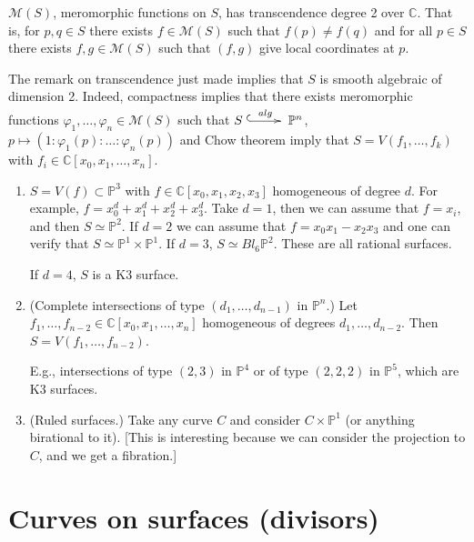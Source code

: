 $\mathcal{M}(S)$, meromorphic functions on
$S$, has transcendence degree
2 over $\mathbb{C}$.
That is, for $p,q \in S$
there exists $f \in \mathcal{M}(S)$
such that $f(p)\neq f(q)$
and for all $p \in S$ there exists $f,g \in
\mathcal{M}(S)$
such that $(f,g)$ give local coordinates at
$p$.

\begin{remark}
\label{remark-trans-impli-surfa-def}
The remark on transcendence just made implies
that $S$
is smooth algebraic of dimension 2.
Indeed, compactness implies that there exists
meromorphic functions  $\varphi_1,…,\varphi_n
\in \mathcal{M}(S)$
such that $S
\xymatrix{\ar@{^{(}->}[r]^{alg}&}\mathbb{P}
^n$,
$p \mapsto (1:\varphi_1(p):…:\varphi_n(p))$
and Chow theorem
imply that $S = V(f_1,…,f_k)$ with
$f_i \in \mathbb{C}[x_0,x_1,…,x_n]$.
\end{remark}

\begin{example}
\label{example-surfaces}
\begin{enumerate}
\item $S = V(f) \subset \mathbb{P}^3$
with $f \in \mathbb{C}[x_0,x_1,x_2,x_3]$
homogeneous of degree $d$.
For example, $f=x_0^d+x_1^d+x_2^d+x_3^d$.
Take $d=1$, then we can assume that $f=x_i$,
and then $S\simeq\mathbb{P}^2$.
If $d=2$ we can assume that
$f=x_0x_1-x_2x_3$ and
one can verify that $S \simeq \mathbb{P}^1
\times \mathbb{P}^1$.
If $d=3$, $S \simeq Bl_6\mathbb{P}^2$.
These are all rational surfaces.

If $d=4$, $S$ is a K3 surface.

\item (Complete intersections of type
$(d_1,…,d_{n-1})$ in $\mathbb{P}^n$.)
Let $f_1,…,f_{n-2} \in
\mathbb{C}[x_0,x_1,…,x_n]$ homogeneous
of degrees $d_1,…,d_{n-2}$.
Then $S=V(f_1,…,f_{n-2})$.

E.g., intersections of type $(2,3)$ in
$\mathbb{P}^4$
or of type $(2,2,2)$ in $\mathbb{P}^5$, which
are K3 surfaces.

\item (Ruled surfaces.)
Take any curve $C$ and consider  $C \times
\mathbb{P}^1$
(or anything birational to it).
[This is interesting because we can consider
the projection to $C$,
and we get a fibration.]
\end{enumerate}
\end{example}

\section{Curves on surfaces (divisors)}
\label{section-curves-on-surfaces}

